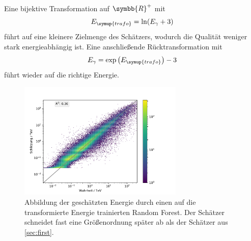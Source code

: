 Eine bijektive Transformation auf $\symbb{R}^+$ mit
\begin{equation}
  E_{\symup{trafo}}=\ln(E_\gamma +3)
  \label{eqn:trafo}
\end{equation}
führt auf eine kleinere Zielmenge des Schätzers, wodurch die Qualität weniger stark energieabhängig ist.
Eine anschließende Rücktransformation mit
\begin{equation}
  E_\gamma = \exp \left(E_{\symup{trafo}}\right)-3
\end{equation}
führt wieder auf die richtige Energie.
\begin{figure}
  \includegraphics[width=0.7\textwidth]{Plots/trafo_encaps.pdf}
  \centering
  \caption{Abbildung der geschätzten Energie durch einen auf die transformierte Energie trainierten Random Forest. Der Schätzer schneidet fast eine Größenordnung
          später ab als der Schätzer aus \autoref{sec:first}.}
  \label{abb:Energie_trafo}
\end{figure}


